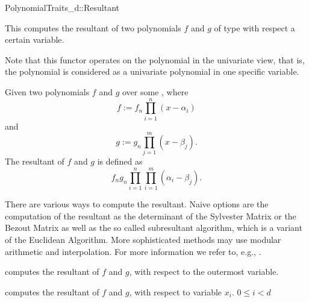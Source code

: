 \begin{ccRefConcept}{PolynomialTraits_d::Resultant}
\ccDefinition

This  computes the resultant of two polynomials 
$f$ and $g$ of type  with respect a 
certain variable.
 
Note that this functor operates on the polynomial in the univariate view, 
that is, the polynomial is considered as a univariate polynomial in one 
specific variable. 

Given two polynomials $f$ and $g$ over some , where 
\[f := f_n \prod_{i=1}^{n}{(x-\alpha_i)}\] 
and 
\[g :=  g_n \prod_{j=1}^{m}{(x-\beta_j)}.\] 
The resultant of $f$ and $g$ is defined as 
\[f_n g_n \prod_{i=1}^{n}\prod_{i=1}^{m}{(\alpha_i-\beta_j)}.\] 

There are various ways to compute the resultant. 
Naive options are the computation of the 
resultant as the determinant of the Sylvester Matrix or the Bezout 
Matrix as well as the so called subresultant algorithm, 
which is a variant of the Euclidean Algorithm. 
More sophisticated methods may use modular arithmetic and interpolation. 
For more information we refer to, e.g., \cite{gg-mca-99}. 




\ccRefines 
{}

\ccTypes
{}
\ccGlue
{}
\ccGlue
{}

\ccOperations
{}
         { computes the resultant of $f$ and $g$, 
           with respect to the outermost variable.}

         { computes the resultant of $f$ and $g$,
           with respect to variable $x_i$. 
           \ccPrecond $0 \leq i  < d$ 
         }


\ccSeeAlso

\\
\\

\end{ccRefConcept}
